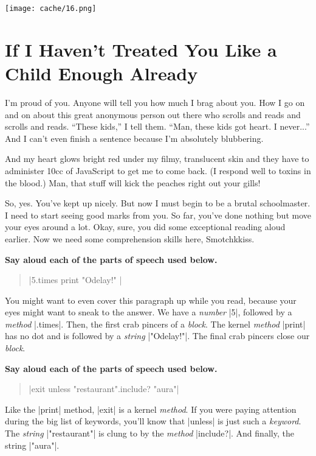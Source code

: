 \documentclass[12pt,twoside]{report}
\begin{document}
	\texttt{[image: cache/16.png]}


\section{If I Haven't Treated You Like a Child Enough Already}


I'm proud of you.  Anyone will tell you how much I brag about you.
How I go on and on about this great anonymous person out there who
scrolls and reads and scrolls and reads.  ``These kids,'' I tell them.
``Man, these kids got heart.  I never...''  And I can't even finish a
sentence because I'm absolutely blubbering.

And my heart glows bright red under my filmy, translucent skin and
they have to administer 10cc of JavaScript to get me to come back.  (I
respond well to toxins in the blood.)  Man, that stuff will kick the
peaches right out your gills!

So, yes.  You've kept up nicely.  But now I must begin to be a brutal
schoolmaster. I need to start seeing good marks from you.  So far,
you've done nothing but move your eyes around a lot.  Okay, sure, you
did some exceptional reading aloud earlier.  Now we need some
comprehension skills here, Smotchkkiss.

{\bf Say aloud each of the parts of speech used below.}

\begin{quote}
\rubyinline|5.times { print "Odelay!" }|\end{quote}


You might want to even cover this paragraph up while you read, because
your eyes might want to sneak to the answer.  We have a {\em number}
\rubyinline|5|, followed by a {\em method}
\rubyinline|.times|.  Then, the first crab pincers of
a {\em block}.  The kernel {\em method}
\rubyinline|print| has no dot and is followed by a
          {\em string} \rubyinline|"Odelay!"|.  The
          final crab pincers close our {\em block}.

{\bf Say aloud each of the parts of speech used below.}

\begin{quote}
\rubyinline|exit unless "restaurant".include? "aura"|\end{quote}


Like the \rubyinline|print| method,
\rubyinline|exit| is a kernel {\em method}.  If you
were paying attention during the big list of keywords, you'll know
that \rubyinline|unless| is just such a {\em keyword}.
The {\em string} \rubyinline|"restaurant"| is clung to
by the {\em method} \rubyinline|include?|.  And
finally, the string \rubyinline|"aura"|.
\end{document}
